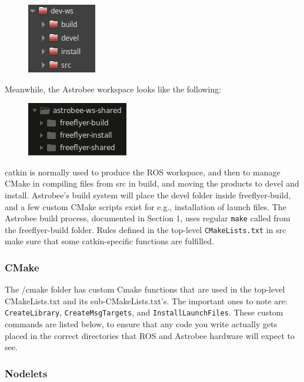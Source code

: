 \documentclass{article}
\begin{document}
\begin{figure}[h!]
	\centering
	\includegraphics[]{img/typical-ws.png}
\end{figure}

Meanwhile, the Astrobee workspace looks like the following:

\begin{figure}[h!]
	\centering
	\includegraphics[]{img/folders.png}
\end{figure}
\vspace{1cm}

catkin is normally used to produce the ROS workspace, and then to manage CMake in compiling files from src in build, and moving the products to devel and install. Astrobee's build system will place the devel folder inside freeflyer-build, and a few custom CMake scripts exist for e.g., installation of launch files. The Astrobee build process, documented in Section 1, uses regular \texttt{make} called from the freeflyer-build folder. Rules defined in the top-level \texttt{CMakeLists.txt} in src make sure that some catkin-specific functions are fulfilled.


\subsubsection{CMake}
The /cmake folder has custom Cmake functions that are used in the top-level CMakeLists.txt and its sub-CMakeLists.txt's. The important ones to note are: \texttt{CreateLibrary}, \texttt{CreateMsgTargets}, and \texttt{InstallLaunchFiles}. These custom commands are listed below, to ensure that any code you write actually gets placed in the correct directories that ROS and Astrobee hardware will expect to see.

\subsubsection{Nodelets}
\end{document}

